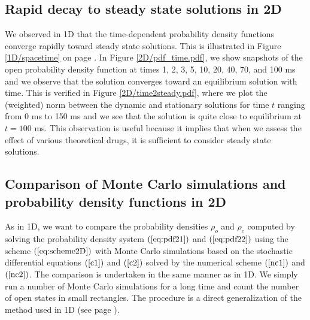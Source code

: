 \subsection{Rapid decay to steady state solutions in 2D \label{rapid2D}}

We observed in 1D that the time-dependent probability density functions
converge rapidly toward steady state solutions. This is illustrated in Figure \ref{1D/spacetime} on page \pageref{1D/spacetime}.  In Figure  \ref{2D/pdf_time.pdf}, we show snapshots of the open probability density function at times 1, 2, 3, 5, 10, 20, 40, 70, and 100 ms and we observe that the solution converges toward an equilibrium solution with time. 
This is verified in Figure \ref{2D/time2steady.pdf}, where we plot the (weighted) norm between the dynamic and stationary solutions for time $t$ ranging from 0 ms to 150 ms and we see that the solution is quite close to equilibrium at $t=100$ ms. This observation is useful because it implies that when we assess the effect of various theoretical drugs, it is sufficient to consider steady state solutions. 






\subsection{Comparison of Monte Carlo simulations and probability density functions in 2D }

As in 1D, we want to compare the probability densities $\rho_o$ and $\rho_c$ computed by solving the 
probability density system $(\ref{eq:pdf21})$ and $(\ref{eq:pdf22})$ using the scheme $(\ref{eq:scheme2D})$ with Monte Carlo simulations based on the stochastic differential equations $(\ref{c1})$ and $(\ref{c2})$ solved by the numerical scheme  $(\ref{nc1})$ and $(\ref{nc2})$. The comparison is undertaken in the same manner as in 1D. We simply run a number of Monte Carlo simulations for a long time and count the number of open states in small rectangles. The procedure is a direct generalization of the method used in 1D (see page \pageref{compare}).

